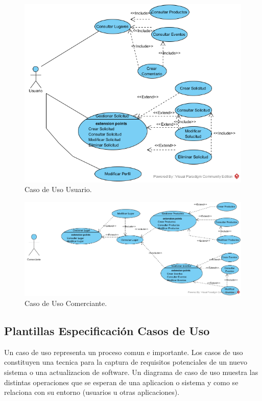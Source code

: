 \documentclass[12pt,letterpaper,openany]{book}
\begin{document}
\begin{figure}[H]
\begin{center}
\includegraphics[width=13cm]{./imagenes/CU/cu_usuario}
\caption{Caso de Uso Usuario.}
\end{center}
\end{figure}

\begin{figure}[H]
\begin{center}
\includegraphics[width=13cm]{./imagenes/CU/cu_comerciante}
\caption{Caso de Uso Comerciante.}
\end{center}
\end{figure}

\subsection{Plantillas Especificación Casos de Uso}
Un caso de uso representa un proceso comun e importante. Los casos de uso constituyen una tecnica para la captura de requisitos potenciales de un nuevo sistema o una actualizacion de software. Un diagrama de caso de uso muestra las distintas operaciones que se esperan de una aplicacion o sistema y como se relaciona con su entorno (usuarios u otras aplicaciones).
\end{document}
